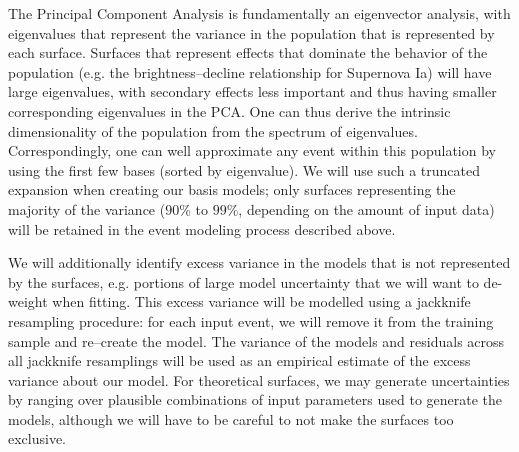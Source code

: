  The Principal Component
Analysis is fundamentally an eigenvector analysis, with eigenvalues that
represent the variance in the population that is represented by each surface.
Surfaces that represent effects that dominate the behavior of the population
(e.g. the brightness--decline relationship for Supernova Ia) will have large
eigenvalues, with secondary effects less important and thus having smaller
corresponding eigenvalues in the PCA.  One can thus derive the intrinsic
dimensionality of the population from the spectrum of eigenvalues.
Correspondingly, one can well approximate any event within this population by
using the first few bases (sorted by eigenvalue).  We will use such a truncated
expansion when creating our basis models; only surfaces representing the
majority of the variance ($90\%$ to $99\%$, depending on the amount of input
data) will be retained in the event modeling process described above.

 We will additionally identify
excess variance in the models that is not represented by the surfaces, e.g.
portions of large model uncertainty that we will want to de-weight when fitting.
This excess variance will be modelled using a jackknife resampling procedure:
for each input event, we will remove it from the training sample and re--create
the model.  The variance of the models and  residuals across all jackknife
resamplings will be used as an empirical estimate of the excess variance about
our model.  For theoretical surfaces, we may generate uncertainties by ranging
over plausible combinations of input parameters used to generate the models,
although we will have to be careful to not make the surfaces too exclusive.

